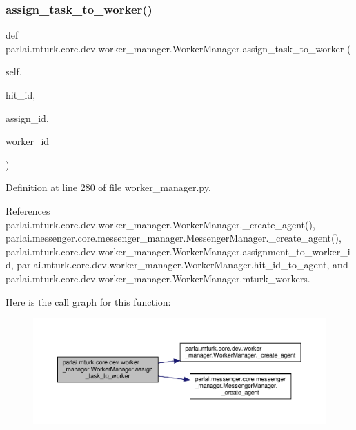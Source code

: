 \subsubsection{\texorpdfstring{assign\+\_\+task\+\_\+to\+\_\+worker()}{assign\_task\_to\_worker()}}
{\footnotesize\ttfamily def parlai.\+mturk.\+core.\+dev.\+worker\+\_\+manager.\+Worker\+Manager.\+assign\+\_\+task\+\_\+to\+\_\+worker (\begin{DoxyParamCaption}\item[{}]{self,  }\item[{}]{hit\+\_\+id,  }\item[{}]{assign\+\_\+id,  }\item[{}]{worker\+\_\+id }\end{DoxyParamCaption})}



Definition at line 280 of file worker\+\_\+manager.\+py.



References parlai.\+mturk.\+core.\+dev.\+worker\+\_\+manager.\+Worker\+Manager.\+\_\+create\+\_\+agent(), parlai.\+messenger.\+core.\+messenger\+\_\+manager.\+Messenger\+Manager.\+\_\+create\+\_\+agent(), parlai.\+mturk.\+core.\+dev.\+worker\+\_\+manager.\+Worker\+Manager.\+assignment\+\_\+to\+\_\+worker\+\_\+id, parlai.\+mturk.\+core.\+dev.\+worker\+\_\+manager.\+Worker\+Manager.\+hit\+\_\+id\+\_\+to\+\_\+agent, and parlai.\+mturk.\+core.\+dev.\+worker\+\_\+manager.\+Worker\+Manager.\+mturk\+\_\+workers.

Here is the call graph for this function\+:
\nopagebreak
\begin{figure}[H]
\begin{center}
\leavevmode
\includegraphics[width=350pt]{classparlai_1_1mturk_1_1core_1_1dev_1_1worker__manager_1_1WorkerManager_a35537f12dc64b0fe56c1b685b31b639f_cgraph}
\end{center}
\end{figure}
\mbox{\label{classparlai_1_1mturk_1_1core_1_1dev_1_1worker__manager_1_1WorkerManager_a91cd8f81f6165b8cea229396c185a75d}} 

